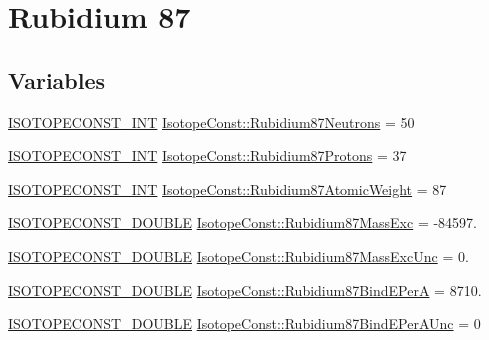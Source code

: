 \hypertarget{group___isotope_const-_rubidium-_rb87}{}\section{Rubidium 87}
\label{group___isotope_const-_rubidium-_rb87}
\subsection*{Variables}
\begin{DoxyCompactItemize}
\item 
\mbox{\hyperlink{group___isotope_const-_macros_ga5f18360b3e99483a35c32d789e62621c}{I\+S\+O\+T\+O\+P\+E\+C\+O\+N\+S\+T\+\_\+\+I\+NT}} \mbox{\hyperlink{group___isotope_const-_rubidium-_rb87_ga87d96eb462733ef8627a3fe7bbe88de8}{Isotope\+Const\+::\+Rubidium87\+Neutrons}} = 50
\item 
\mbox{\hyperlink{group___isotope_const-_macros_ga5f18360b3e99483a35c32d789e62621c}{I\+S\+O\+T\+O\+P\+E\+C\+O\+N\+S\+T\+\_\+\+I\+NT}} \mbox{\hyperlink{group___isotope_const-_rubidium-_rb87_gae9ed825b67edb560dcbd2b7ea3a4ef0b}{Isotope\+Const\+::\+Rubidium87\+Protons}} = 37
\item 
\mbox{\hyperlink{group___isotope_const-_macros_ga5f18360b3e99483a35c32d789e62621c}{I\+S\+O\+T\+O\+P\+E\+C\+O\+N\+S\+T\+\_\+\+I\+NT}} \mbox{\hyperlink{group___isotope_const-_rubidium-_rb87_gaeffad89c5687c7ef17625446d999f0f9}{Isotope\+Const\+::\+Rubidium87\+Atomic\+Weight}} = 87
\item 
\mbox{\hyperlink{group___isotope_const-_macros_ga8f45a7272ce02c0b4c65c44636ed719a}{I\+S\+O\+T\+O\+P\+E\+C\+O\+N\+S\+T\+\_\+\+D\+O\+U\+B\+LE}} \mbox{\hyperlink{group___isotope_const-_rubidium-_rb87_ga9cfc37c8b48860c713b1f2e2a5c97f90}{Isotope\+Const\+::\+Rubidium87\+Mass\+Exc}} = -\/84597.
\item 
\mbox{\hyperlink{group___isotope_const-_macros_ga8f45a7272ce02c0b4c65c44636ed719a}{I\+S\+O\+T\+O\+P\+E\+C\+O\+N\+S\+T\+\_\+\+D\+O\+U\+B\+LE}} \mbox{\hyperlink{group___isotope_const-_rubidium-_rb87_gad54faf75fb7e1f6d36272c9c3148a941}{Isotope\+Const\+::\+Rubidium87\+Mass\+Exc\+Unc}} = 0.
\item 
\mbox{\hyperlink{group___isotope_const-_macros_ga8f45a7272ce02c0b4c65c44636ed719a}{I\+S\+O\+T\+O\+P\+E\+C\+O\+N\+S\+T\+\_\+\+D\+O\+U\+B\+LE}} \mbox{\hyperlink{group___isotope_const-_rubidium-_rb87_ga55140142acaf9a489813517ae03ddddd}{Isotope\+Const\+::\+Rubidium87\+Bind\+E\+PerA}} = 8710.
\item 
\mbox{\hyperlink{group___isotope_const-_macros_ga8f45a7272ce02c0b4c65c44636ed719a}{I\+S\+O\+T\+O\+P\+E\+C\+O\+N\+S\+T\+\_\+\+D\+O\+U\+B\+LE}} \mbox{\hyperlink{group___isotope_const-_rubidium-_rb87_gaa17aaa4614a653e4f206dda9ca3188ff}{Isotope\+Const\+::\+Rubidium87\+Bind\+E\+Per\+A\+Unc}} = 0

\end{DoxyCompactItemize}
